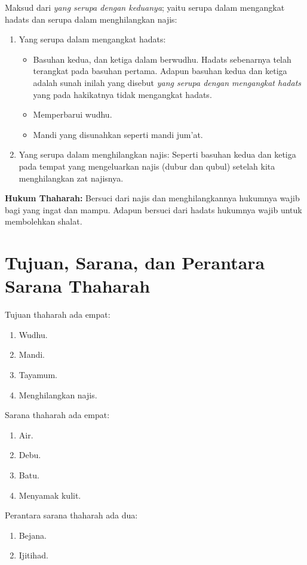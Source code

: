 Maksud dari \textit{yang serupa dengan keduanya}; yaitu serupa dalam mengangkat hadats dan serupa dalam menghilangkan najis:
\begin{enumerate}
    \item Yang serupa dalam mengangkat hadats:
    \begin{itemize}
        \item Basuhan kedua, dan ketiga dalam berwudhu. Hadats sebenarnya telah terangkat pada basuhan pertama. Adapun basuhan kedua dan ketiga adalah sunah inilah yang disebut \textit{yang serupa dengan mengangkat hadats} yang pada hakikatnya tidak mengangkat hadats.
        \item Memperbarui wudhu.
        \item Mandi yang disunahkan seperti mandi jum’at.
    \end{itemize}
    \item Yang serupa dalam menghilangkan najis: Seperti basuhan kedua dan ketiga pada tempat yang mengeluarkan najis (dubur dan qubul) setelah kita menghilangkan zat najisnya.
\end{enumerate}

\textbf{Hukum Thaharah:} Bersuci dari najis dan menghilangkannya hukumnya wajib bagi yang ingat dan mampu. Adapun bersuci dari hadats hukumnya wajib untuk membolehkan shalat.

\section{Tujuan, Sarana, dan Perantara Sarana Thaharah}

Tujuan thaharah ada empat: 
\begin{enumerate}
    \item Wudhu.
    \item Mandi. 
    \item Tayamum. 
    \item Menghilangkan najis.
\end{enumerate}

Sarana thaharah ada empat: 
\begin{enumerate}
    \item Air.
    \item Debu.
    \item Batu. 
    \item Menyamak kulit.
\end{enumerate}

Perantara sarana thaharah ada dua: 
\begin{enumerate}
    \item Bejana.
    \item Ijitihad.
\end{enumerate}
